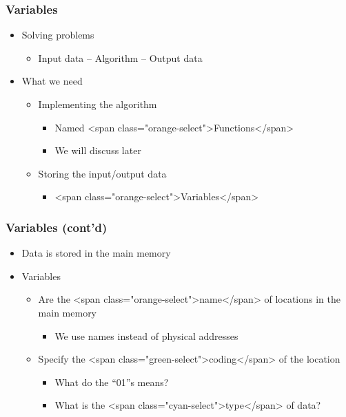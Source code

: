 \documentclass{../c-lecture}
\begin{document}
\begin{frame}
  \frametitle{Variables}
  \begin{itemize}
    \item Solving problems
    \begin{itemize}
      \item Input data -- Algorithm -- Output data
    \end{itemize}
    \item What we need
    \begin{itemize}
      \item Implementing the algorithm
      \begin{itemize}
        \item Named <span class="orange-select">Functions</span>
        \item We will discuss later
      \end{itemize}
      \item Storing the input/output data
      \begin{itemize}
        \item <span class="orange-select">Variables</span>
      \end{itemize}
    \end{itemize}
  \end{itemize}
\end{frame}
\begin{frame}
  \frametitle{Variables (cont’d)}
  \begin{itemize}
    \item Data is stored in the main memory
    \item Variables
    \begin{itemize}
      \item
        Are the <span class="orange-select">name</span> of locations in the main
        memory

      \begin{itemize}
        \item We use names instead of physical addresses
      \end{itemize}
      \item
        Specify the <span class="green-select">coding</span> of the location

      \begin{itemize}
        \item What do the “01”s means?
        \item What is the <span class="cyan-select">type</span> of data?
      \end{itemize}
    \end{itemize}
  \end{itemize}
\end{frame}
\end{document}
